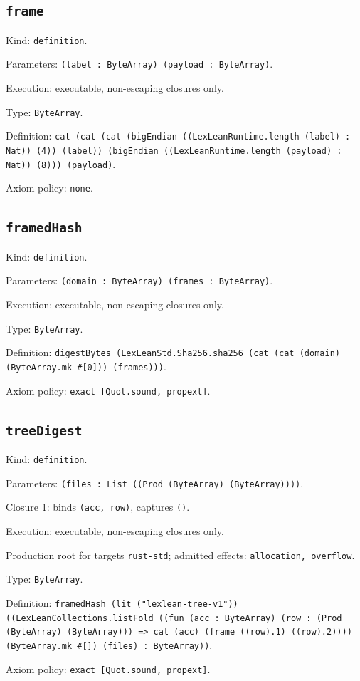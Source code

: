 \documentclass[11pt]{article}
\begin{document}
\subsection*{\texttt{frame}}
\noindent Kind: \texttt{definition}.\par
\noindent Parameters: \texttt{(label : ByteArray) (payload : ByteArray)}.\par
\noindent Execution: executable, non-escaping closures only.\par
\noindent Type: \texttt{ByteArray}.\par
\noindent Definition: \texttt{cat (cat (cat (bigEndian ((LexLeanRuntime.length (label) : Nat)) (4)) (label)) (bigEndian ((LexLeanRuntime.length (payload) : Nat)) (8))) (payload)}.\par
\noindent Axiom policy: \texttt{none}.\par
\subsection*{\texttt{framedHash}}
\noindent Kind: \texttt{definition}.\par
\noindent Parameters: \texttt{(domain : ByteArray) (frames : ByteArray)}.\par
\noindent Execution: executable, non-escaping closures only.\par
\noindent Type: \texttt{ByteArray}.\par
\noindent Definition: \texttt{digestBytes (LexLeanStd.Sha256.sha256 (cat (cat (domain) (ByteArray.mk \#[0])) (frames)))}.\par
\noindent Axiom policy: \texttt{exact [Quot.sound, propext]}.\par
\subsection*{\texttt{treeDigest}}
\noindent Kind: \texttt{definition}.\par
\noindent Parameters: \texttt{(files : List ((Prod (ByteArray) (ByteArray))))}.\par
\noindent Closure 1: binds \texttt{(acc, row)}, captures \texttt{()}.\par
\noindent Execution: executable, non-escaping closures only.\par
\noindent Production root for targets \texttt{rust-std}; admitted effects: \texttt{allocation, overflow}.\par
\noindent Type: \texttt{ByteArray}.\par
\noindent Definition: \texttt{framedHash (lit ("lexlean-tree-v1")) ((LexLeanCollections.listFold ((fun (acc : ByteArray) (row : (Prod (ByteArray) (ByteArray))) => cat (acc) (frame ((row).1) ((row).2)))) (ByteArray.mk \#[]) (files) : ByteArray))}.\par
\noindent Axiom policy: \texttt{exact [Quot.sound, propext]}.\par
\end{document}
